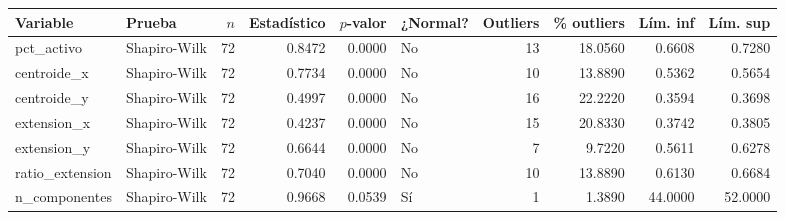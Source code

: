 \begin{tabular}{llrrrlrrrr}
\toprule
Variable & Prueba & $n$ & Estadístico & $p$-valor & ¿Normal? & Outliers & \% outliers & Lím. inf & Lím. sup \\
\midrule
pct_activo & Shapiro-Wilk & 72 & 0.8472 & 0.0000 & No & 13 & 18.0560 & 0.6608 & 0.7280 \\
centroide_x & Shapiro-Wilk & 72 & 0.7734 & 0.0000 & No & 10 & 13.8890 & 0.5362 & 0.5654 \\
centroide_y & Shapiro-Wilk & 72 & 0.4997 & 0.0000 & No & 16 & 22.2220 & 0.3594 & 0.3698 \\
extension_x & Shapiro-Wilk & 72 & 0.4237 & 0.0000 & No & 15 & 20.8330 & 0.3742 & 0.3805 \\
extension_y & Shapiro-Wilk & 72 & 0.6644 & 0.0000 & No & 7 & 9.7220 & 0.5611 & 0.6278 \\
ratio_extension & Shapiro-Wilk & 72 & 0.7040 & 0.0000 & No & 10 & 13.8890 & 0.6130 & 0.6684 \\
n_componentes & Shapiro-Wilk & 72 & 0.9668 & 0.0539 & Sí & 1 & 1.3890 & 44.0000 & 52.0000 \\
\bottomrule
\end{tabular}
